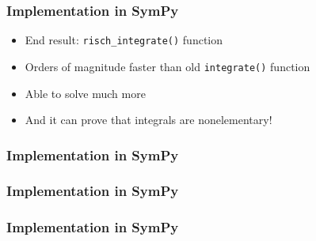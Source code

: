 \documentclass{beamer}
\numberwithin{equation}{section} %
\newcommand{\rischintegrate}{\texttt{risch\_integrate()}}
\begin{document}
\begin{frame}
    \frametitle{Implementation in SymPy}
    \begin{itemize}
        \item End result: \rischintegrate{} function
        \pause
        \item Orders of magnitude faster than old \texttt{integrate()} function
        \item Able to solve much more
        \item And it can prove that integrals are nonelementary!
    \end{itemize}
\end{frame}
\begin{frame}
    \frametitle{Implementation in SymPy}
    \begin{figure}[t!]
    \end{figure}
\end{frame}

\begin{frame}
    \frametitle{Implementation in SymPy}
    \begin{figure}
    \begin{flushleft}
    \pause
    \end{flushleft}
    \end{figure}
\end{frame}

\begin{frame}
    \frametitle{Implementation in SymPy}
    \begin{figure}
    \begin{flushleft}
    \end{flushleft}
    \end{figure}
\end{frame}
\end{document}
